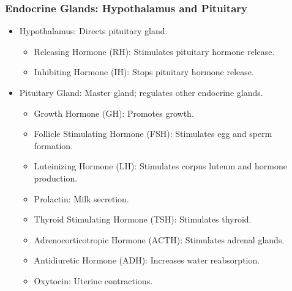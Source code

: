 \begin{frame}[fragile]\frametitle{Endocrine Glands: Hypothalamus and Pituitary}

      \begin{itemize}
		\item Hypothalamus: Directs pituitary gland.
		  \begin{itemize}
		    \item Releasing Hormone (RH): Stimulates pituitary hormone release.
		    \item Inhibiting Hormone (IH): Stops pituitary hormone release.
		  \end{itemize}
		\item Pituitary Gland: Master gland; regulates other endocrine glands.
		  \begin{itemize}
		    \item Growth Hormone (GH): Promotes growth.
		    \item Follicle Stimulating Hormone (FSH): Stimulates egg and sperm formation.
		    \item Luteinizing Hormone (LH): Stimulates corpus luteum and hormone production.
		    \item Prolactin: Milk secretion.
		    \item Thyroid Stimulating Hormone (TSH): Stimulates thyroid.
		    \item Adrenocorticotropic Hormone (ACTH): Stimulates adrenal glands.
		    \item Antidiuretic Hormone (ADH): Increases water reabsorption.
		    \item Oxytocin: Uterine contractions.
		  \end{itemize}
	  \end{itemize}

\end{frame}

